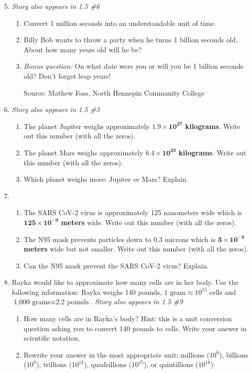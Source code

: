 \begin{enumerate} 
\setcounter{enumi}{4}

\item \emph{Story also appears in 1.5 \#6}
\begin{enumerate}
\item Convert 1 million seconds into an understandable unit of time. 
\item Billy Bob wants to throw a party when he turns 1 billion seconds old. About how many years old will he be?
\item \emph{Bonus question:}  On what date were you or will you be 1 billion seconds old?  Don't forget leap years! \hfill \begin{footnotesize} Source:  Mathew Foss, North Hennepin Community College \end{footnotesize} %
\end{enumerate}  

\item \emph{Story also appears in 1.5 \#3} 
\begin{enumerate}
\item The planet Jupiter weighs approximately $\mathbf{1.9 \times 10^{27}}$ \textbf{kilograms}. Write out this number (with all the zeros).
\item The planet Mars weighs approximately $\mathbf{6.4 \times 10^{23}}$ \textbf{kilograms}. Write out this number (with all the zeros).
\item Which planet weighs more:  Jupiter or Mars?  Explain. 
\end{enumerate}

\item \begin{enumerate}
\item The SARS CoV-2 virus is approximately 125 nanometers wide which is 
$\mathbf{125 \times 10^{-9}}$ \textbf{meters} wide. Write out this number (with all the zeros).
\item The N95 mask prevents particles down to 0.3 microns which is 
$\mathbf{3 \times 10^{-6}}$ \textbf{meters} wide but not smaller. Write out this number (with all the zeros).
\item Can the N95 mask prevent the SARS CoV-2 virus?  Explain.
\end{enumerate}

\item  Rayka would like to approximate how many cells are in her body.  Use the following information: Rayka weighs 140 pounds, $1 \text{ gram} \approx 10^{15} \text{ cells}$ and $\text{1,000 grams} \approx \text{2.2 pounds}$.
\hfill \emph{Story also appears in 1.5 \#9}
\begin{enumerate}
\item How many cells are in Rayka's body?  Hint: this is a unit conversion question asking you to convert 140 pounds to cells.  Write your answer in scientific notation.
\item Rewrite your answer in the most appropriate unit:  millions ($10^6$), billions ($10^9$), trillions ($10^{12}$), quadrillions ($10^{15}$), or quintillions ($10^{18}$).
\end{enumerate}


\end{enumerate}
